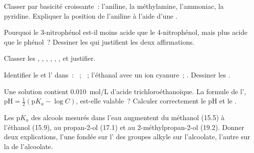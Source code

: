 \begin{exercise}[$\star\star$]\label{exo:b1:electronic-effects:6}
Classer par basicité croissante~: l'aniline, la méthylamine,
l'ammoniac, la pyridine. Expliquer la position de l'aniline à l'aide
d'une .
\end{exercise}

\begin{exercise}[$\star\star$]\label{exo:b1:electronic-effects:7}
Pourquoi le 3-nitrophénol est-il moins acide que le 4-nitrophénol, mais
plus acide que le phénol~? Dessiner les  qui
justifient les deux affirmations.
\end{exercise}

\begin{exercise}[$\star\star$]\label{exo:b1:electronic-effects:8}
Classer les  , , ,
, , , et justifier.
\end{exercise}

\begin{exercise}[$\star\star$]\label{exo:b1:electronic-effects:9}
Identifier le  et l' dans~: ~;
~; l'éthanal avec un ion cyanure~; .
Dessiner les .
\end{exercise}

\begin{exercise}[$\star\star\star$]\label{exo:b1:electronic-effects:10}
Une solution contient \qty{0.010}{mol/L} d'acide trichloroéthanoïque. La
formule de l', $\mathrm{pH} = \frac12(\mathrm{p}K_a - \log C)$,
est-elle valable~? Calculer correctement le pH et le .
\end{exercise}

\begin{exercise}[$\star\star\star$]\label{exo:b1:electronic-effects:11}
Les $\mathrm{p}K_a$ des alcools mesurés dans l'eau augmentent du
méthanol (15.5) à l'éthanol (15.9), au propan-2-ol (17.1) et au
2-méthylpropan-2-ol (19.2). Donner deux explications, l'une fondée sur
l' des groupes alkyle sur l'alcoolate, l'autre sur la
 de l'alcoolate.
\end{exercise}

